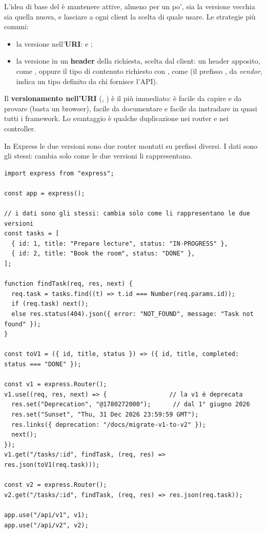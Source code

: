 L'idea di base del  è mantenere attive, almeno per un po',
sia la versione vecchia sia quella nuova, e lasciare a ogni client la scelta di
quale usare. Le strategie più comuni:

\begin{itemize}
  \item la versione nell'\textbf{URI}:  e ;
  \item la versione in un \textbf{header} della richiesta, scelta dal client:
        un header apposito, come , oppure il tipo di
        contenuto richiesto con , come
         (il prefisso
        , da \textit{vendor}, indica un tipo definito da chi
        fornisce l'API).
\end{itemize}

Il \textbf{versionamento nell'URI} (,
) è il più immediato: è facile da capire e da provare
(basta un browser), facile da documentare e facile da instradare in quasi tutti
i framework. Lo svantaggio è qualche duplicazione nei router e nei controller.

In Express le due versioni sono due router montati su prefissi diversi. I dati
sono gli stessi: cambia solo come le due versioni li rappresentano.

\begin{lstlisting}[style=js, name=versioni.js]
import express from "express";

const app = express();

// i dati sono gli stessi: cambia solo come li rappresentano le due versioni
const tasks = [
  { id: 1, title: "Prepare lecture", status: "IN-PROGRESS" },
  { id: 2, title: "Book the room", status: "DONE" },
];

function findTask(req, res, next) {
  req.task = tasks.find((t) => t.id === Number(req.params.id));
  if (req.task) next();
  else res.status(404).json({ error: "NOT_FOUND", message: "Task not found" });
}

const toV1 = ({ id, title, status }) => ({ id, title, completed: status === "DONE" });

const v1 = express.Router();
v1.use((req, res, next) => {                 // la v1 è deprecata
  res.set("Deprecation", "@1780272000");      // dal 1° giugno 2026
  res.set("Sunset", "Thu, 31 Dec 2026 23:59:59 GMT");
  res.links({ deprecation: "/docs/migrate-v1-to-v2" });
  next();
});
v1.get("/tasks/:id", findTask, (req, res) => res.json(toV1(req.task)));

const v2 = express.Router();
v2.get("/tasks/:id", findTask, (req, res) => res.json(req.task));

app.use("/api/v1", v1);
app.use("/api/v2", v2);
\end{lstlisting}


